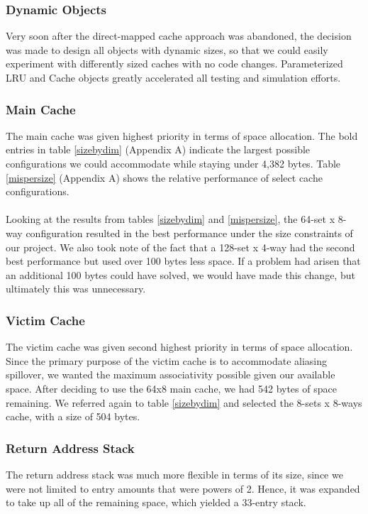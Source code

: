 \documentclass[twocolumn]{article}
\begin{document}
\subsubsection{Dynamic Objects}
Very soon after the direct-mapped cache approach was abandoned, the decision was made to design all objects with dynamic sizes, so that we could easily experiment with differently sized caches with no code changes.  Parameterized LRU and Cache objects greatly accelerated all testing and simulation efforts. 
\subsubsection{Main Cache}
The main cache was given highest priority in terms of space allocation.  The bold entries in table \ref{sizebydim} (Appendix A) indicate the largest possible configurations we could accommodate while staying under 4,382 bytes.  Table \ref{mispersize} (Appendix A) shows the relative performance  of select cache configurations.\\\\
Looking at the results from tables \ref{sizebydim} and \ref{mispersize}, the 64-set x 8-way configuration resulted in the best performance under the size constraints of our project.  We also took note of the fact that a 128-set x 4-way had the second best performance but used over 100 bytes less space.  If a problem had arisen that an additional 100 bytes could have solved, we would have made this change, but ultimately this was unnecessary. 
\subsubsection{Victim Cache}
The victim cache was given second highest priority in terms of space allocation.  Since the primary purpose of the victim cache is to accommodate aliasing spillover, we wanted the maximum associativity possible given our available space.   After deciding to use the 64x8 main cache, we had 542 bytes of space remaining.  We referred again to table \ref{sizebydim} and selected the 8-sets x 8-ways cache, with a size of 504 bytes.  
\subsubsection{Return Address Stack}
The return address stack was much more flexible in terms of its size, since we were not limited to entry amounts that were powers of 2.  Hence, it was expanded to take up all of the remaining space, which yielded a 33-entry stack. 
\end{document}
